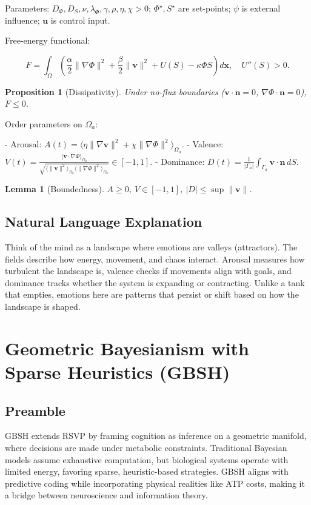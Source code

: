 \documentclass[11pt]{article}
\theoremstyle{plain}
\newtheorem{proposition}{Proposition}
\newtheorem{lemma}{Lemma}
\begin{document}
Parameters: \(D_\Phi, D_S, \nu, \lambda_\Phi, \gamma, \rho, \eta, \chi > 0\); \(\Phi^\star, S^\star\) are set-points; \(\psi\) is external influence; \(\mathbf{u}\) is control input.

Free-energy functional:

\[
F = \int_\Omega \left( \frac{\alpha}{2} \|\nabla \Phi\|^2 + \frac{\beta}{2} \|\mathbf{v}\|^2 + U(S) - \kappa \Phi S \right) d\mathbf{x}, \quad U''(S) > 0.
\]

\begin{proposition}[Dissipativity]
Under no-flux boundaries (\(\mathbf{v} \cdot \mathbf{n} = 0\), \(\nabla \Phi \cdot \mathbf{n} = 0\)), \(\dot{F} \leq 0\).
\end{proposition}

Order parameters on \(\Omega_a\):

- Arousal: \(A(t) = \langle \eta \|\nabla \mathbf{v}\|^2 + \chi \|\nabla \Phi\|^2 \rangle_{\Omega_a}\).
- Valence: \(V(t) = \frac{\langle \mathbf{v} \cdot \nabla \Phi \rangle_{\Omega_a}}{\sqrt{\langle \|\mathbf{v}\|^2 \rangle_{\Omega_a} \langle \|\nabla \Phi\|^2 \rangle_{\Omega_a}}} \in [-1, 1]\).
- Dominance: \(D(t) = \frac{1}{|\Gamma_a|} \int_{\Gamma_a} \mathbf{v} \cdot \mathbf{n} \, dS\).

\begin{lemma}[Boundedness]
\(A \geq 0\), \(V \in [-1, 1]\), \(|D| \leq \sup \|\mathbf{v}\|\).
\end{lemma}

\subsection{Natural Language Explanation}
Think of the mind as a landscape where emotions are valleys (attractors). The fields describe how energy, movement, and chaos interact. Arousal measures how turbulent the landscape is, valence checks if movements align with goals, and dominance tracks whether the system is expanding or contracting. Unlike a tank that empties, emotions here are patterns that persist or shift based on how the landscape is shaped.

\section{Geometric Bayesianism with Sparse Heuristics (GBSH)}

\subsection{Preamble}
GBSH extends RSVP by framing cognition as inference on a geometric manifold, where decisions are made under metabolic constraints. Traditional Bayesian models assume exhaustive computation, but biological systems operate with limited energy, favoring sparse, heuristic-based strategies. GBSH aligns with predictive coding while incorporating physical realities like ATP costs, making it a bridge between neuroscience and information theory.
\end{document}
